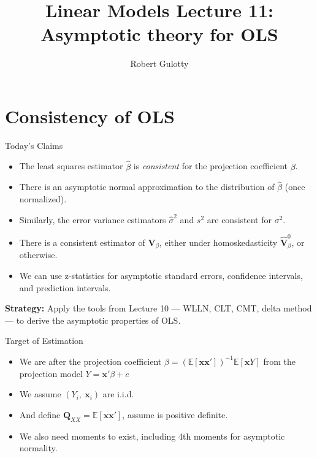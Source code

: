 \documentclass[aspectratio=169, handout, t]{beamer}
\title[PLSC 30700]{Linear Models Lecture 11: Asymptotic theory for OLS}
\author{Robert Gulotty}
\institute[Chicago]{University of Chicago}
\numberwithin{equation}{section}
\begin{document}
\begin{frame}
\maketitle
\end{frame}

\section{Consistency of OLS}
\setcounter{subsection}{1}

\begin{frame}{Today's Claims}
\begin{itemize}
\item The least squares estimator $\hat{\beta}$ is \emph{consistent} for the projection coefficient $\beta$.
\item There is an asymptotic normal approximation to the distribution of $\hat{\beta}$ (once normalized).
\item Similarly, the error variance estimators $\hat{\sigma}^2$ and $s^2$ are consistent for $\sigma^2$.
\item There is a consistent estimator of $\bm{V}_\beta$, either under homoskedasticity $\bm{\hat{V}}^0_\beta$, or otherwise.
\item We can use z-statistics for asymptotic standard errors, confidence intervals, and prediction intervals.
\end{itemize}

\pause

\begin{tcolorbox}[colback=blue!5, colframe=blue!50]
\textbf{Strategy:} Apply the tools from Lecture 10 --- WLLN, CLT, CMT, delta method --- to derive the asymptotic properties of OLS.
\end{tcolorbox}
\end{frame}


\begin{frame}{Target of Estimation}
\begin{itemize}
\item We are after the projection coefficient $\beta=(\mathbb{E}[\bm{x}\bm{x}'])^{-1}\mathbb{E}[\bm{x}Y]$ from the projection model $Y=\bm{x}'\beta+e$
\item We assume $(Y_i,\ \bm{x}_i)$ are i.i.d.
\item And define $\bm{Q}_{XX}=\mathbb{E}[\bm{x}\bm{x}']$, assume is positive definite.
\item We also need moments to exist, including 4th moments for asymptotic normality.
\end{itemize}
\end{frame}
\end{document}
